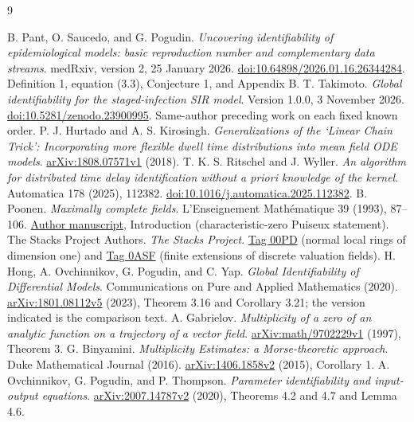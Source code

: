 \documentclass[11pt]{article}
\theoremstyle{remark}\newtheorem{remark}[theorem]{Remark}
\begin{document}
\begin{thebibliography}{9}\small\raggedright
{} B. Pant, O. Saucedo, and G. Pogudin.
\emph{Uncovering identifiability of epidemiological models: basic reproduction number and complementary data streams}.
medRxiv, version 2, 25 January 2026.
\href{https://doi.org/10.64898/2026.01.16.26344284}{doi:10.64898/2026.01.16.26344284}.
Definition 1, equation (3.3), Conjecture 1, and Appendix B.
 T. Takimoto.
\emph{Global identifiability for the staged-infection SIR model}.
Version 1.0.0, 3 November 2026.
\href{https://doi.org/10.5281/zenodo.23900995}{doi:10.5281/zenodo.23900995}.
Same-author preceding work on each fixed known order.
 P. J. Hurtado and A. S. Kirosingh.
\emph{Generalizations of the `Linear Chain Trick': Incorporating more flexible dwell time distributions into mean field ODE models}.
\href{https://arxiv.org/abs/1808.07571v1}{arXiv:1808.07571v1} (2018).
 T. K. S. Ritschel and J. Wyller.
\emph{An algorithm for distributed time delay identification without a priori knowledge of the kernel}.
Automatica 178 (2025), 112382.
\href{https://doi.org/10.1016/j.automatica.2025.112382}{doi:10.1016/j.automatica.2025.112382}.
 B. Poonen.
\emph{Maximally complete fields}.
L'Enseignement Math\'ematique 39 (1993), 87--106.
\href{https://math.mit.edu/~poonen/papers/amsval.pdf}{Author manuscript}, Introduction (characteristic-zero Puiseux statement).
 The Stacks Project Authors.
\emph{The Stacks Project}.
\href{https://stacks.math.columbia.edu/tag/00PD}{Tag 00PD} (normal local rings of dimension one) and
\href{https://stacks.math.columbia.edu/tag/0ASF}{Tag 0ASF} (finite extensions of discrete valuation fields).
 H. Hong, A. Ovchinnikov, G. Pogudin, and C. Yap.
\emph{Global Identifiability of Differential Models}.
Communications on Pure and Applied Mathematics (2020).
\href{https://arxiv.org/abs/1801.08112v5}{arXiv:1801.08112v5} (2023),
Theorem 3.16 and Corollary 3.21; the version indicated is the comparison text.
 A. Gabrielov.
\emph{Multiplicity of a zero of an analytic function on a trajectory of a vector field}.
\href{https://arxiv.org/abs/math/9702229v1}{arXiv:math/9702229v1} (1997), Theorem 3.
 G. Binyamini.
\emph{Multiplicity Estimates: a Morse-theoretic approach}.
Duke Mathematical Journal (2016).
\href{https://arxiv.org/abs/1406.1858v2}{arXiv:1406.1858v2} (2015), Corollary 1.
 A. Ovchinnikov, G. Pogudin, and P. Thompson.
\emph{Parameter identifiability and input-output equations}.
\href{https://arxiv.org/abs/2007.14787v2}{arXiv:2007.14787v2} (2020),
Theorems 4.2 and 4.7 and Lemma 4.6.

\end{thebibliography}
\end{document}
